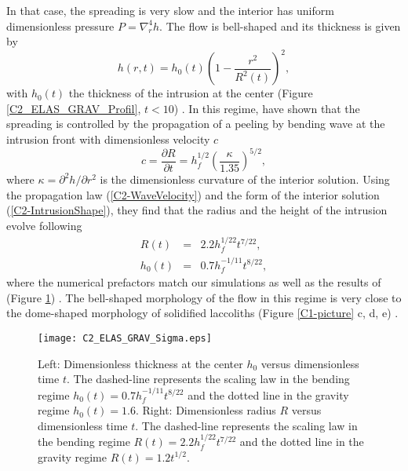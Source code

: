 In that case, the spreading is  very slow and the interior has uniform
dimensionless pressure $P =\nabla_r^4h$.   The flow is bell-shaped and
its thickness is given by
\begin{equation}
  h(r,t) = h_0(t)\left(1-\frac{r^2}{R^2(t)}\right)^2,
  \label{C2-IntrusionShape}
\end{equation}
with $h_0(t)$  the thickness  of the intrusion  at the  center (Figure
\ref{C2_ELAS_GRAV_Profil},                                     $t<10$)
\citep{Michaut:2011kg,Lister:2013ia}.       In       this      regime,
\citet{Lister:2013ia} have  shown that the spreading  is controlled by
the propagation  of a peeling by  bending wave at the  intrusion front
with dimensionless velocity $c$
\begin{equation}
  c=    \frac{\partial             R}{\partial            t}             =h_f^{1/2}
  \left(\frac{\kappa}{1.35}\right)^{5/2},
  \label{C2-WaveVelocity}
\end{equation}
where  $\kappa  =  \partial^2  h/\partial r^2$  is  the  dimensionless
curvature  of  the  interior  solution.   Using  the  propagation  law
(\ref{C2-WaveVelocity})  and   the  form  of  the   interior  solution
(\ref{C2-IntrusionShape}), they find that the radius and the height of
the intrusion evolve following
\begin{eqnarray}
  R(t) &=& 2.2h_f^{1/22}t^{7/22},\label{C2-ScalingR}\\
  h_0(t)&=&0.7 h_f^{-1/11}t^{8/22},\label{C2-ScalingH}
\end{eqnarray}
where the  numerical prefactors match  our simulations as well  as the
results  of  \citet{Lister:2013ia}  (Figure  \ref{C2_ELAS_GRAV_Sigma})
. The bell-shaped morphology of the  flow in this regime is very close
to  the  dome-shaped  morphology   of  solidified  laccoliths  (Figure
\ref{C1-picture} c, d, e) \citep{Michaut:2011kg}.

\begin{figure}[h!]
  \begin{center}
    \graphicspath{ {/Users/thorey/Documents/These/Manuscript/Figure/Chapter2/} }
    \texttt{[image: C2\_ELAS\_GRAV\_Sigma.eps]}
    \caption{Left: Dimensionless thickness at  the center $h_0$ versus
      dimensionless time $t$.  The  dashed-line represents the scaling
      law in  the bending regime $h_0(t)=0.7  h_f^{-1/11}t^{8/22}$ and
      the dotted  line in the  gravity regime $h_0(t) =  1.6$.  Right:
      Dimensionless  radius $R$  versus dimensionless  time $t$.   The
      dashed-line  represents the  scaling law  in the  bending regime
      $R(t)  =  2.2h_f^{1/22}t^{7/22}$  and  the dotted  line  in  the
      gravity regime $R(t) = 1.2t^{1/2}$.}
    \label{C2_ELAS_GRAV_Sigma}
  \end{center}
\end{figure}

